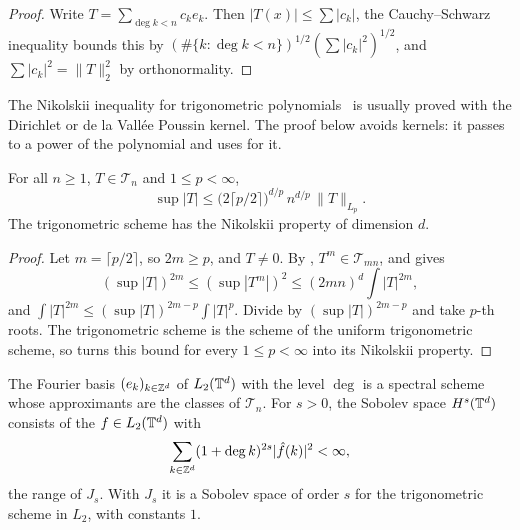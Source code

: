 \begin{proof}
\leanok
Write $T = \sum_{\deg k < n} c_k e_k$. Then $|T(x)| \leq \sum |c_k|$, the Cauchy--Schwarz
inequality bounds this by $(\#\{k : \deg k < n\})^{1/2} (\sum |c_k|^2)^{1/2}$, and
$\sum |c_k|^2 = \|T\|_2^2$ by orthonormality.
\end{proof}

The Nikolskii inequality for trigonometric polynomials~\cite{Nikolskii, Temlyakov} is
usually proved with the Dirichlet or de la Vall\'ee Poussin kernel. The proof below avoids
kernels: it passes to a power of the polynomial and uses  for it.

\begin{theorem}
\label{thm:torus-nikolskii}
\leanok
{}
For all $n \geq 1$, $T \in \mathcal{T}_n$ and $1 \leq p < \infty$,
\[
  \sup |T| \leq \bigl(2 \lceil p/2 \rceil\bigr)^{d/p} \, n^{d/p} \, \|T\|_{L_p} .
\]
The trigonometric scheme has the Nikolskii property of dimension $d$.
\end{theorem}

\begin{proof}
\leanok
{}
Let $m = \lceil p/2 \rceil$, so $2m \geq p$, and $T \neq 0$. By ,
$T^m \in \mathcal{T}_{mn}$, and  gives
\[
  (\sup|T|)^{2m} \leq (\sup|T^m|)^2 \leq (2mn)^d \int |T|^{2m} ,
\]
and $\int |T|^{2m} \leq (\sup|T|)^{2m-p} \int |T|^p$.
Divide by $(\sup|T|)^{2m-p}$ and take $p$-th roots. The trigonometric scheme is the scheme of
the uniform trigonometric scheme, so  turns this bound
for every $1 \leq p < \infty$ into its Nikolskii property.
\end{proof}

\begin{definition}
\label{def:torus-sobolev}
\leanok
{}
The Fourier basis $(e_k)_{k \in \mathbb{Z}^d}$ of $L_2(\mathbb{T}^d)$ with the level $\deg$ is a spectral
scheme whose approximants are the classes of $\mathcal{T}_n$. For $s > 0$, the Sobolev space
$H^s(\mathbb{T}^d)$ consists of the $f \in L_2(\mathbb{T}^d)$ with
\[
  \sum_{k \in \mathbb{Z}^d} (1 + \deg k)^{2s} |\hat f(k)|^2 < \infty ,
\]
the range of $J_s$. With $J_s$ it is a Sobolev space of order $s$ for the trigonometric
scheme in $L_2$, with constants $1$.
\end{definition}

